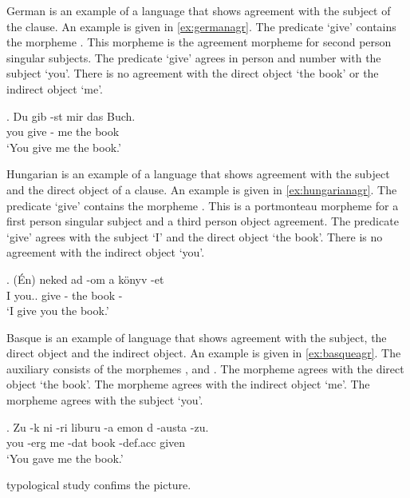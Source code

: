 German is an example of a language that shows agreement with the subject of the clause. An example is given in \ref{ex:germanagr}. The predicate  `give' contains the morpheme . This morpheme is the agreement morpheme for second person singular subjects. The predicate  `give' agrees in person and number with the subject  `you'. There is no agreement with the direct object  `the book' or the indirect object  `me'.

\exg. Du gib -st mir das Buch.\\
 you give - me the book\\
 `You give me the book.' \label{ex:germanagr}

Hungarian is an example of a language that shows agreement with the subject and the direct object of a clause. An example is given in \ref{ex:hungarianagr}. The predicate  `give' contains the morpheme . This is a portmonteau morpheme for a first person singular subject and a third person object agreement. The predicate  `give' agrees with the subject  `I' and the direct object  `the book'. There is no agreement with the indirect object  `you'.

\exg. (Én) neked ad -om a könyv -et\\
 I you.. give - the book -\\
 `I give you the book.' \label{ex:hungarianagr}

Basque is an example of language that shows agreement with the subject, the direct object and the indirect object. An example is given in \ref{ex:basqueagr}. The auxiliary consists of the morphemes ,  and . The morpheme  agrees with the direct object  `the book'. The morpheme  agrees with the indirect object  `me'. The morpheme  agrees with the subject  `you'.

\exg. Zu -k ni -ri liburu -a emon d -austa -zu.\\
 you -\ac{erg} me -\ac{dat} book -\ac{def}.\ac{acc} given   \\
 `You gave me the book.' \label{ex:basqueagr}

 typological study confims the picture.

